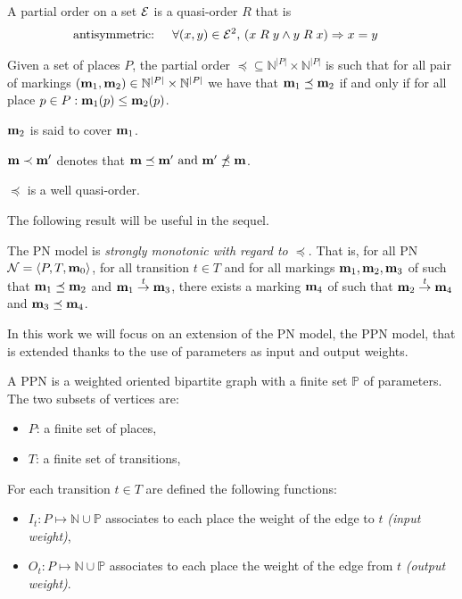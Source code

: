 \begin{defi}
  A partial order on a set $\mathcal{E}$ is a quasi-order $R$ that is
  \begin{align*}
    \text{antisymmetric: } &&\forall (x, y) \in \mathcal{E}^2,\ & (x \mathrel{R} y\land y \mathrel{R} x)\Rightarrow x = y
  \end{align*}
\end{defi}

\begin{defi}
  Given a set of places $P$, the partial order \(\preceq \subseteq \mathbb{N}^{|P|} \times \mathbb{N}^{|P|}\) is such that for all pair of markings \((\mathbf{m}_1, \mathbf{m}_2) \in \mathbb{N}^{|P|} \times \mathbb{N}^{|P|}\) we have that \(\mathbf{m}_1 \preceq \mathbf{m}_2\) if and only if for all place \(p \in P : \mathbf{m}_1(p) \leq \mathbf{m}_2(p)\).

  $\mathbf{m}_2$ is said to cover $\mathbf{m}_1$.
\end{defi}

\(\mathbf{m} \prec \mathbf{m'}\) denotes that \(\mathbf{m} \preceq \mathbf{m'} \text{ and } \mathbf{m'} \npreceq \mathbf{m}\).

\begin{lemm}
  \label{lemm:wqo}
  $\preceq$ is a well quasi-order.
\end{lemm}

The following result will be useful in the sequel.

\begin{lemm}
  The \ac{PN} model is \emph{strongly monotonic with regard to $\preceq$}. That is, for all \ac{PN} $\mathcal{N} = \langle P,T, \mathbf{m}_0\rangle$, for all transition $t \in T$ and for all markings $\mathbf{m}_1, \mathbf{m}_2, \mathbf{m}_3$ of \N such that $\mathbf{m}_1 \preceq \mathbf{m}_2$ and $\mathbf{m}_1 \stackrel{t}{\to} \mathbf{m}_3$, there exists a marking $\mathbf{m}_4$ of \N such that $\mathbf{m}_2 \stackrel{t}{\to} \mathbf{m}_4$ and $\mathbf{m}_3 \preceq \mathbf{m}_4$.
\end{lemm}

In this work we will focus on an extension of the \ac{PN} model, the \ac{PPN} model, that is extended thanks to the use of parameters as input and output weights.

\begin{defi}
  A \acf{PPN} \SPTP is a weighted oriented bipartite graph with a finite set $\mathbb{P}$ of parameters. The two subsets of vertices are:
  \begin{itemize}
    \item $P$: a finite set of places,
    \item $T$: a finite set of transitions,
  \end{itemize}
  For each transition $t \in T$ are defined the following functions:
  \begin{itemize}
    \item $I_t : P \mapsto \mathbb{N} \cup \mathbb{P}$ associates to each place the weight of the edge to $t$ \emph{(input weight)},
    \item $O_t : P \mapsto \mathbb{N} \cup \mathbb{P}$ associates to each place the weight of the edge from $t$ \emph{(output weight)}.
  \end{itemize}
\end{defi}

